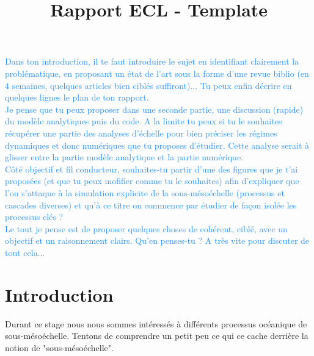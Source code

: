 \documentclass{rapportECC}
\title{Rapport ECL - Template} %
\newcommand{\FAadd}[1]{\textcolor{DodgerBlue}{{#1}}}                     %
\begin{document}





        
\fairemarges %
\fairepagedegarde %
\tabledematieres %

\FAadd{Dans ton introduction, il te faut introduire le sujet en identifiant clairement la problématique, en proposant un état de l'art sous la forme d'une revue biblio (en 4 semaines, quelques articles bien ciblés suffiront)... Tu peux enfin décrire en quelques lignes le plan de ton rapport.\\
Je pense que tu peux proposer dans une seconde partie, une discussion (rapide) du modèle analytiques puis du code. A la limite tu peux si tu le souhaites récupérer une partie des analyses d'échelle pour bien préciser les régimes dynamiques et donc numériques que tu proposes d'étudier. Cette analyse serait à glisser entre la partie modèle analytique et la partie numérique.\\
Côté objectif et fil conducteur, souhaites-tu partir d'une des figures que je t'ai proposées (et que tu peux mofifier comme tu le souhaites) afin d'expliquer que l'on s'attaque à la simulation explicite de la sous-mésoéchelle (processus et cascades diverses) et qu'à ce titre on commence par étudier de façon isolée les processus clés ? \\
Le tout je pense est de proposer quelques choses de cohérent, ciblé, avec un objectif et un raisonnement clairs. Qu'en penses-tu ?
A très vite pour discuter de tout cela...
}

\section{Introduction} 



Durant ce stage nous nous sommes intéressés à différents processus océanique de sous-mésoéchelle. Tentons de comprendre un petit peu ce qui ce cache derrière la notion de "sous-mésoéchelle".
\end{document}
